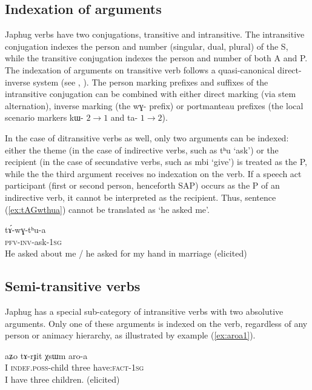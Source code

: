 \documentclass[oldfontcommands,oneside,a4paper,11pt]{article}
\newcommand{\ipa}[1]{{\phon #1}} %
\newcommand{\refb}[1]{(\ref{#1})}
\begin{document}
\subsection{Indexation of arguments}

Japhug verbs have two conjugations, transitive and intransitive. The intransitive conjugation indexes the person and number (singular, dual, plural) of the S, while the transitive conjugation indexes the person and number of both A and P. The indexation of arguments on transitive verb follows a quasi-canonical direct-inverse system (see \citealt{jacques10inverse}, \citealt{jacques14inverse}). The person marking prefixes and suffixes of the intransitive conjugation can be combined with either direct marking (via stem alternation), inverse marking (the \ipa{wɣ-} prefix) or portmanteau prefixes (the local scenario markers \ipa{kɯ-} $2\rightarrow1$ and \ipa{ta-} $1\rightarrow2$).


In the case of ditransitive verbs as well, only two arguments can be indexed: either the theme (in the case of indirective verbs, such as \ipa{tʰu} `ask') or the recipient (in the case of secundative verbs, such as \ipa{mbi} `give') is treated as the P, while the the third argument receives no indexation on the verb. If a  speech act participant (first or second person, henceforth SAP) occurs as the P of an indirective verb, it cannot be interpreted as the recipient. Thus, sentence \refb{ex:tAGwthua} cannot be translated as `he asked me'.

 \begin{exe}
   \ex   \label{ex:tAGwthua}
 \gll
\ipa{tɤ́-wɣ-tʰu-a} \\
\textsc{pfv-inv}-ask-\textsc{1sg}\\
\glt He asked about me / he asked for my hand in marriage (elicited)   
      \end{exe}  
      

\subsection{Semi-transitive verbs}
  Japhug has a special sub-category of intransitive verbs with two absolutive arguments. Only one of these arguments is indexed on the verb, regardless of any person or animacy hierarchy, as illustrated by example \refb{ex:aroa1}.
  

 \begin{exe}
   \ex   \label{ex:aroa1}
 \gll 
\ipa{aʑo}  	\ipa{tɤ-rɟit}  	\ipa{χsɯm}  	\ipa{aro-a}   \\
I \textsc{indef.poss}-child three have:\textsc{fact}-\textsc{1sg} \\
 \glt   I have three children. (elicited)
   \end{exe} 
\end{document}
